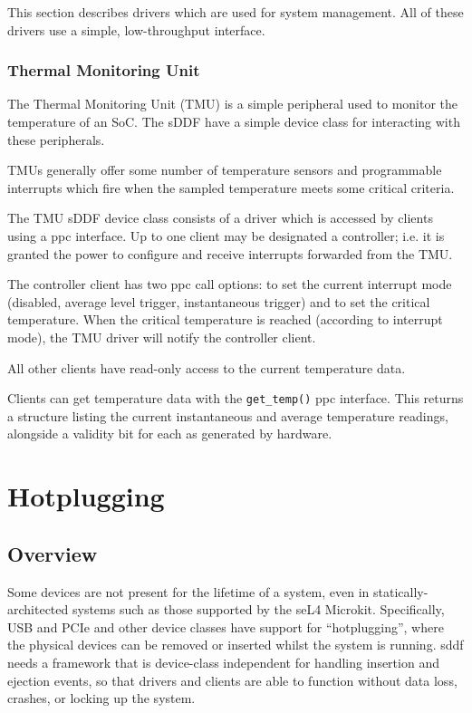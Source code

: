 \documentclass[a4paper,12pt]{report}
\begin{document}
This section describes drivers which are used for system management. All of
these drivers use a simple, low-throughput interface.

\subsection{Thermal Monitoring Unit}\label{s:tmu}

The Thermal Monitoring Unit (TMU) is a simple peripheral used to monitor the temperature of
an SoC. The sDDF have a simple device class for interacting with these peripherals.

TMUs generally offer some number of temperature sensors and programmable interrupts
which fire when the sampled temperature meets some critical criteria.

The TMU sDDF device class consists of a driver which is accessed by clients using a
\gls{ppc} interface. Up to one client may be designated a controller; i.e. it
is granted the power to configure and receive interrupts forwarded from the
TMU.

The controller client has two \gls{ppc} call options: to set the current
interrupt mode (disabled, average level trigger, instantaneous trigger) and
to set the critical temperature. When the critical temperature is reached
(according to interrupt mode), the TMU driver will notify the controller client.

All other clients have read-only access to the current temperature data.

Clients can get temperature data with the \texttt{get\_temp()} \gls{ppc} interface.
This returns a structure listing the current instantaneous and average temperature
readings, alongside a validity bit for each as generated by hardware.

\iffalse



\chapter{Hotplugging}\label{s:hotplugging}

\section{Overview}

Some devices are not present for the lifetime of a system,
even in statically-architected systems such as those supported by the seL4
Microkit. Specifically, USB and PCIe and other device classes have support for ``hotplugging'',
where the physical devices can be removed or inserted whilst the system is running.
\gls{sddf} needs a framework that is device-class independent for handling
insertion and ejection events, so that drivers and clients are able to function
without data loss, crashes, or locking up the system.
\end{document}
